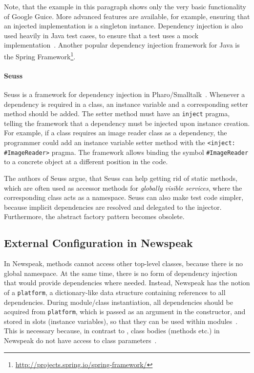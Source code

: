 Note, that the example in this paragraph shows only the very basic functionality of Google Guice. More advanced features are available, for example, ensuring that an injected implementation is a singleton instance. Dependency injection is also used heavily in Java test cases, to ensure that a test uses a mock implementation~\cite{Yang:2008:ESU:1395083.1395674}. Another popular dependency injection framework for Java is the Spring Framework\footnote{\url{http://projects.spring.io/spring-framework/}}.

\paragraph{Seuss}
Seuss is a framework for dependency injection in Pharo/Smalltalk~\cite{JOT:issue_2012_04/article3}. Whenever a dependency is required in a class, an instance variable and a corresponding setter method should be added. The setter method must have an \texttt{inject} pragma, telling the framework that a dependency must be injected upon instance creation. For example, if a class requires an image reader class as a dependency, the programmer could add an instance variable setter method with the \texttt{<inject: \#ImageReader>} pragma. The framework allows binding the symbol \texttt{\#ImageReader} to a concrete object at a different position in the code. 

The authors of Seuss argue, that Seuss can help getting rid of static methods, which are often used as accessor methods for \emph{globally visible services}, where the corresponding class acts as a namespace. Seuss can also make test code simpler, because implicit dependencies are resolved and delegated to the injector. Furthermore, the abstract factory pattern becomes obsolete.

\subsection{External Configuration in Newspeak}
In Newspeak, methods cannot access other top-level classes, because there is no global namespace. At the same time, there is no form of dependency injection that would provide dependencies where needed. Instead, Newspeak has the notion of a \texttt{platform}, a dictionary-like data structure containing references to all dependencies. During module/class instantiation, all dependencies should be acquired from \texttt{platform}, which is passed as an argument in the constructor, and stored in slots (instance variables), so that they can be used within modules~\cite{bracha:modules_as_objects}. This is necessary because, in contrast to \msname, class bodies (methods etc.) in Newspeak do not have access to class parameters~\cite{Bracha09newspeakprogramming}.

